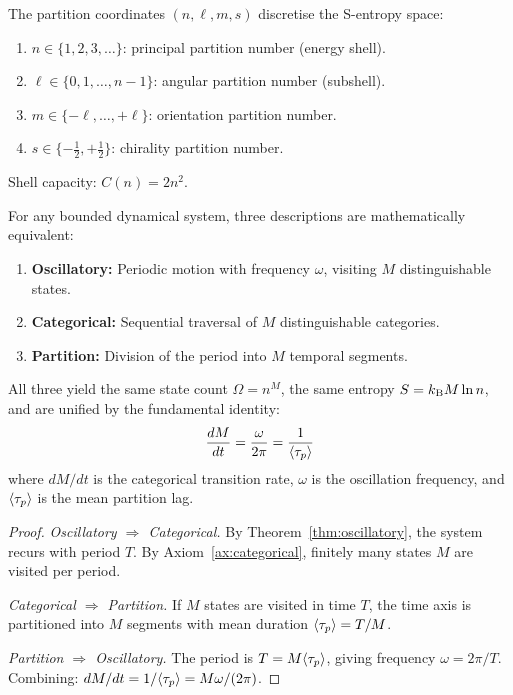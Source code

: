 \begin{definition}
\label{def:partition_coords}
The partition coordinates $(n, \ell, m, s)$ discretise the S-entropy space:
\begin{enumerate}[label=(\roman*)]
    \item $n \in \{1, 2, 3, \ldots\}$: principal partition number (energy shell).
    \item $\ell \in \{0, 1, \ldots, n-1\}$: angular partition number (subshell).
    \item $m \in \{-\ell, \ldots, +\ell\}$: orientation partition number.
    \item $s \in \{-\tfrac{1}{2}, +\tfrac{1}{2}\}$: chirality partition number.
\end{enumerate}
Shell capacity: $C(n) = 2n^2$.
\end{definition}

\begin{theorem}
\label{thm:triple}
For any bounded dynamical system, three descriptions are mathematically equivalent:
\begin{enumerate}
    \item \textbf{Oscillatory:} Periodic motion with frequency $\omega$, visiting $M$ distinguishable states.
    \item \textbf{Categorical:} Sequential traversal of $M$ distinguishable categories.
    \item \textbf{Partition:} Division of the period into $M$ temporal segments.
\end{enumerate}
All three yield the same state count $\Omega = n^M$, the same entropy $S = k_{\mathrm{B}} M \ln n$, and are unified by the fundamental identity:
\begin{equation}
\label{eq:fundamental}
    \frac{dM}{dt} = \frac{\omega}{2\pi} = \frac{1}{\langle\tau_p\rangle}
\end{equation}
where $dM/dt$ is the categorical transition rate, $\omega$ is the oscillation frequency, and $\langle\tau_p\rangle$ is the mean partition lag.
\end{theorem}

\begin{proof}
\emph{Oscillatory $\Rightarrow$ Categorical.} By Theorem~\ref{thm:oscillatory}, the system recurs with period $T$. By Axiom~\ref{ax:categorical}, finitely many states $M$ are visited per period.

\emph{Categorical $\Rightarrow$ Partition.} If $M$ states are visited in time $T$, the time axis is partitioned into $M$ segments with mean duration $\langle\tau_p\rangle = T/M$.

\emph{Partition $\Rightarrow$ Oscillatory.} The period is $T = M\langle\tau_p\rangle$, giving frequency $\omega = 2\pi/T$. Combining: $dM/dt = 1/\langle\tau_p\rangle = M\omega/(2\pi)$.
\end{proof}

